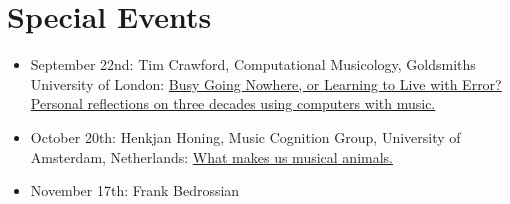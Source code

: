 \documentclass[11pt]{amsart}
\begin{document}
\section{Special Events}
\begin{itemize}

\item September 22nd: Tim Crawford, Computational Musicology, Goldsmiths University of London: \href{http://www.cirmmt.org/activities/distinguished-lectures/Tim_Crawford}{Busy Going Nowhere, or Learning to Live with Error? Personal reflections on three decades using computers with music.}
\item October 20th: Henkjan Honing, Music Cognition Group, University of Amsterdam, Netherlands: \href{http://www.cirmmt.org/activities/distinguished-lectures/copy_of_vorlander}{What makes us musical animals.}
\item November 17th: Frank Bedrossian


\end{itemize}
\end{document}
